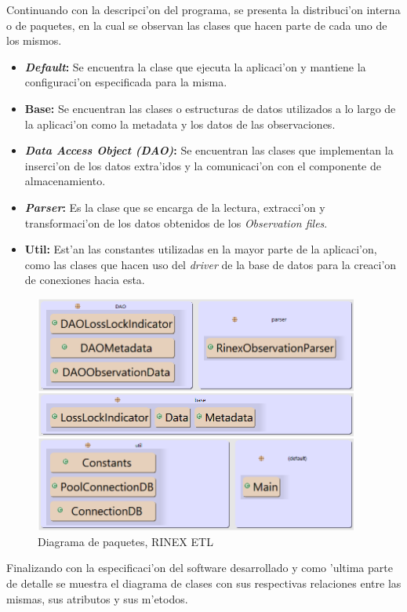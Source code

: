 \begin{enumerate}
Continuando con la descripci'on del programa, se presenta la distribuci'on interna o de paquetes, en la cual se observan las clases que hacen parte de cada uno de los mismos.

\begin{itemize}
\item \textbf{\emph{Default}:} Se encuentra la clase que ejecuta la aplicaci'on y mantiene la configuraci'on especificada para la misma.
\item \textbf{Base:} Se encuentran las clases o estructuras de datos utilizados a lo largo de la aplicaci'on como la metadata y los datos de las observaciones.
\item \textbf{\emph{Data Access Object (DAO)}:} Se encuentran las clases que implementan la inserci'on de los datos extra'idos y la comunicaci'on con el componente de almacenamiento.
\item \textbf{\emph{Parser}:} Es la clase que se encarga de la lectura, extracci'on y transformaci'on de los datos obtenidos de los \emph{Observation files}.
\item \textbf{Util:} Est'an las constantes utilizadas en la mayor parte de la aplicaci'on, como las clases que hacen uso del \emph{driver} de la base de datos para la creaci'on de conexiones hacia esta.
\end{itemize}

\begin{figure}[H]
\centering
\includegraphics[width=0.95\textwidth]{images/Package_Diagram}
\caption{Diagrama de paquetes, RINEX ETL}
\label{fig:4.7}
\end{figure}

Finalizando con la especificaci'on del software desarrollado y como 'ultima parte de detalle se muestra el diagrama de clases con sus respectivas relaciones entre las mismas, sus atributos y sus m'etodos.


\end{enumerate}
